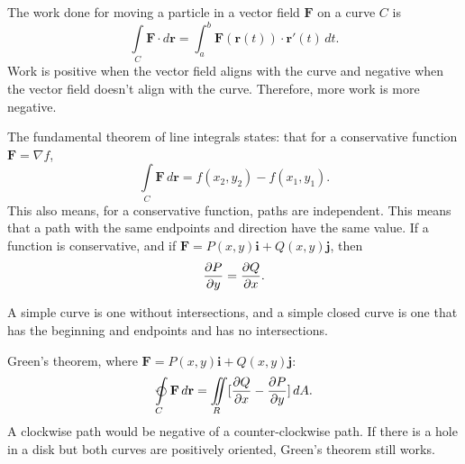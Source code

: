 \documentclass{article}
\begin{document}
The work done for moving a particle in a vector field $\mathbf{F}$ on a curve $C$ is
\[
\int \limits_C \mathbf{F} \cdot d\mathbf{r} = 
\int_a^b \mathbf{F}(\mathbf{r}(t)) \cdot \mathbf{r}'(t) \, dt.
\]
Work is positive when the vector field aligns with the curve and negative when
the vector field doesn't align with the curve. Therefore, more work is more negative. 

The fundamental theorem of line integrals states: 
that for a conservative function $\mathbf{F} = \nabla f$,
\[
\int \limits_C \mathbf{F} \, d\mathbf{r} = f(x_2, y_2) - f(x_1, y_1).
\]
This also means, for a conservative function, paths are independent.
This means that a path with the same endpoints and direction
have the same value. If a function is conservative,
and if $\mathbf{F} = P(x,y)\mathbf{i} + Q(x,y)\mathbf{j}$, then
\[
\pdv{P}{y} = \pdv{Q}{x}.
\]

A simple curve is one without intersections,
and a simple closed curve is one that has the beginning and endpoints
and has no intersections.

Green's theorem, where $\mathbf{F} = P(x,y)\mathbf{i} + Q(x,y)\mathbf{j}$:
\[
\varointctrclockwise \limits_C \mathbf{F} \, d\mathbf{r} =
\iint \limits_R [\pdv{Q}{x} - \pdv{P}{y}] \, dA.
\]
A clockwise path would be negative of a counter-clockwise path.
If there is a hole in a disk but both curves are positively oriented,
Green's theorem still works.
\end{document}

